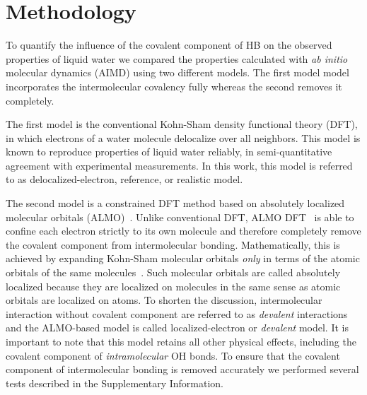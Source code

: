\documentclass[aps,prl,reprint,amsmath,amssymb]{revtex4-1}
\begin{document}

\section{Methodology}

To quantify the influence of the covalent component of HB on the observed properties of liquid water we compared the properties calculated with \emph{ab initio} molecular dynamics (AIMD) using two different models. 
The first model model incorporates the intermolecular covalency fully whereas the second removes it completely.

The first model is the conventional Kohn-Sham density functional theory (DFT), in which electrons of a water molecule delocalize over all neighbors. 
This model is known to reproduce properties of liquid water reliably, in semi-quantitative agreement with experimental measurements. 
In this work, this model is referred to as delocalized-electron, reference, or realistic model. 

The second model is a constrained DFT method based on absolutely localized molecular orbitals (ALMO)~\cite{khaliullin2006efficient}. 
Unlike conventional DFT, ALMO DFT~\cite{Khaliullin2013JCTC} is able to confine each electron strictly to its own molecule and therefore completely remove the covalent component from intermolecular bonding. 
Mathematically, this is achieved by expanding Kohn-Sham molecular orbitals \emph{only} in terms of the atomic orbitals of the same molecules~\cite{gian,khaliullin2006efficient, blw}. 
Such molecular orbitals are called absolutely localized because they are localized on molecules in the same sense as atomic orbitals are localized on atoms. 
To shorten the discussion, intermolecular interaction without covalent component are referred to as \emph{devalent} interactions and the ALMO-based model is called localized-electron or \emph{devalent} model. 
It is important to note that this model retains all other physical effects, including the covalent component of \emph{intramolecular} OH bonds. %
To ensure that the covalent component of intermolecular bonding is removed accurately we performed several tests described in the Supplementary Information.
\end{document}
